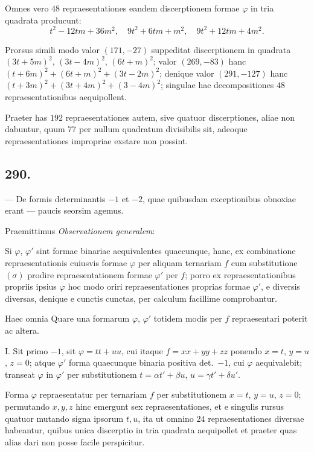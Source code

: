 \documentclass[12pt,a4paper]{article}
\theoremstyle{plain}
\theoremstyle{definition}
\theoremstyle{remark}
\begin{document}
Omnes vero $48$ repraesentationes eandem discerptionem formae $\varphi$ in tria
quadrata producunt:
\[
t^2 - 12tm + 36m^2, \quad 9t^2 + 6tm + m^2, \quad 9t^2 + 12tm + 4m^2.
\]

Prorsus simili modo valor $(171, -27)$ suppeditat discerptionem in quadrata
$(3t + 5m)^2$, $(3t - 4m)^2$, $(6t + m)^2$; valor $(269, -83)$ hanc
$(t + 6m)^2 + (6t + m)^2 + (3t - 2m)^2$; denique valor $(291, -127)$ hanc
$(t + 3m)^2 + (3t + 4m)^2 + (3 - 4m)^2$; singulae hae decompositiones
$48$ repraesentationibus aequipollent.

Praeter has $192$ repraesentationes autem, sive quatuor discerptiones, aliae non
dabuntur, quum $77$ per nullum quadratum divisibilis sit, adeoque repraesentationes
impropriae exstare non possint.

\subsection*{290.}

--- De formis determinantis $-1$ et $-2$, quae quibusdam exceptionibus
obnoxiae erant --- paucis seorsim agemus.

Praemittimus \emph{Observationem generalem}:

Si $\varphi$, $\varphi'$ sint formae binariae aequivalentes quaecunque, hanc, ex combinatione
repraesentationis cuiusvis formae $\varphi$ per aliquam ternariam $f$ cum substitutione
$(\sigma)$ prodire repraesentationem formae $\varphi'$ per $f$; porro ex repraesentationibus
propriis ipsius $\varphi$ hoc modo oriri repraesentationes proprias formae $\varphi'$, e diversis
diversas, denique e cunctis cunctas, per calculum facillime comprobantur.

Haec omnia Quare una formarum $\varphi$, $\varphi'$ totidem modis per $f$ repraesentari
poterit ac altera.

\textsc{I.} Sit primo $-1$, sit $\varphi = tt + uu$, cui itaque $f = xx + yy + zz$
ponendo $x = t$, $y = u$, $z = 0$; atque $\varphi'$ forma quaecunque binaria positiva
det.\@~$-1$, cui $\varphi$ aequivalebit; transeat $\varphi$ in $\varphi'$ per substitutionem
$t = \alpha t' + \beta u$, $u = \gamma t' + \delta u'$.

Forma $\varphi$ repraesentatur per ternariam $f$ per substitutionem $x = t$, $y = u$,
$z = 0$; permutando $x, y, z$ hinc emergunt sex repraesentationes, et e singulis
rursus quatuor mutando signa ipsorum $t, u$, ita ut omnino $24$ repraesentationes
diversae habeantur, quibus unica discerptio in tria quadrata aequipollet et praeter
quas alias dari non posse facile perspicitur.
\end{document}
